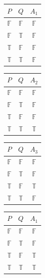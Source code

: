 \documentclass[a4paper,12pt]{article}
\begin{document}
\begin{enumerate}
\begin{enumerate}
\begin{table}[!htb]
\begin{minipage}{.2\linewidth}
\begin{tabular}{|c|c|c|}
$P$          & $Q$          & $A_1$        \\\hline
$\mathbb{F}$ & $\mathbb{F}$ & $\mathbb{F}$ \\
$\mathbb{F}$ & $\mathbb{T}$ & $\mathbb{F}$ \\
$\mathbb{T}$ & $\mathbb{F}$ & $\mathbb{F}$ \\
$\mathbb{T}$ & $\mathbb{T}$ & $\mathbb{F}$ \\\hline
\end{tabular}
    \end{minipage}%
    \begin{minipage}{.2\linewidth}
      \centering
        \begin{tabular}{|c|c|c|}\hline
$P$          & $Q$          & $A_2$        \\\hline
$\mathbb{F}$ & $\mathbb{F}$ & $\mathbb{F}$ \\
$\mathbb{F}$ & $\mathbb{T}$ & $\mathbb{F}$ \\
$\mathbb{T}$ & $\mathbb{F}$ & $\mathbb{F}$ \\
$\mathbb{T}$ & $\mathbb{T}$ & $\mathbb{T}$ \\\hline
\end{tabular}    \end{minipage}%
    \begin{minipage}{.2\linewidth}
      \centering
        \begin{tabular}{|c|c|c|}\hline
$P$          & $Q$          & $A_3$        \\\hline
$\mathbb{F}$ & $\mathbb{F}$ & $\mathbb{F}$ \\
$\mathbb{F}$ & $\mathbb{T}$ & $\mathbb{F}$ \\
$\mathbb{T}$ & $\mathbb{F}$ & $\mathbb{T}$ \\
$\mathbb{T}$ & $\mathbb{T}$ & $\mathbb{F}$ \\\hline
\end{tabular}
    \end{minipage}%
    \begin{minipage}{.2\linewidth}
      \centering
        \begin{tabular}{|c|c|c|}\hline
$P$          & $Q$          & $A_1$        \\\hline
$\mathbb{F}$ & $\mathbb{F}$ & $\mathbb{F}$ \\
$\mathbb{F}$ & $\mathbb{T}$ & $\mathbb{F}$ \\
$\mathbb{T}$ & $\mathbb{F}$ & $\mathbb{T}$ \\
$\mathbb{T}$ & $\mathbb{T}$ & $\mathbb{T}$ \\\hline

\end{tabular}
\end{minipage}
\end{table}
\end{enumerate}
\end{enumerate}
\end{document}
